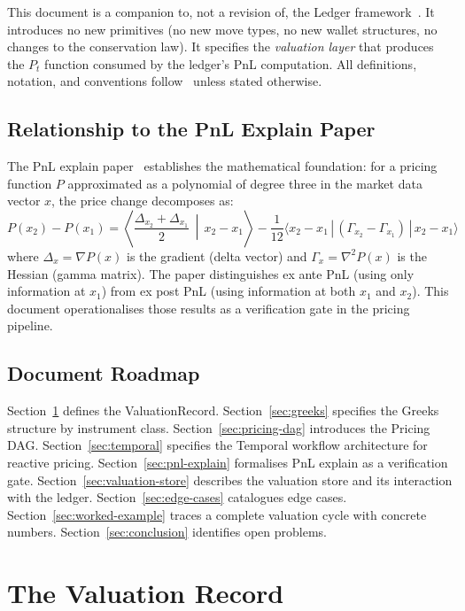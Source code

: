 \documentclass[11pt,a4paper]{article}
\begin{document}
This document is a companion to, not a revision of, the Ledger framework~\cite{ledger}.  It introduces no new primitives (no new move types, no new wallet structures, no changes to the conservation law).  It specifies the \emph{valuation layer} that produces the $P_t$ function consumed by the ledger's PnL computation.  All definitions, notation, and conventions follow~\cite{ledger} unless stated otherwise.

\subsection{Relationship to the PnL Explain Paper}

The PnL explain paper~\cite{pnl_explain} establishes the mathematical foundation: for a pricing function $P$ approximated as a polynomial of degree three in the market data vector $x$, the price change decomposes as:
\[
P(x_2) - P(x_1) = \left\langle \frac{\Delta_{x_2} + \Delta_{x_1}}{2} \,\middle|\, x_2 - x_1 \right\rangle - \frac{1}{12}\langle x_2 - x_1 \,|\, (\Gamma_{x_2} - \Gamma_{x_1}) \,|\, x_2 - x_1 \rangle
\]
where $\Delta_x = \nabla P(x)$ is the gradient (delta vector) and $\Gamma_x = \nabla^2 P(x)$ is the Hessian (gamma matrix).  The paper distinguishes ex ante PnL (using only information at $x_1$) from ex post PnL (using information at both $x_1$ and $x_2$).  This document operationalises those results as a verification gate in the pricing pipeline.

\subsection{Document Roadmap}

Section~\ref{sec:valuation-record} defines the ValuationRecord.  Section~\ref{sec:greeks} specifies the Greeks structure by instrument class.  Section~\ref{sec:pricing-dag} introduces the Pricing DAG.  Section~\ref{sec:temporal} specifies the Temporal workflow architecture for reactive pricing.  Section~\ref{sec:pnl-explain} formalises PnL explain as a verification gate.  Section~\ref{sec:valuation-store} describes the valuation store and its interaction with the ledger.  Section~\ref{sec:edge-cases} catalogues edge cases.  Section~\ref{sec:worked-example} traces a complete valuation cycle with concrete numbers.  Section~\ref{sec:conclusion} identifies open problems.

\clearpage
\section{The Valuation Record}
\label{sec:valuation-record}
\end{document}
